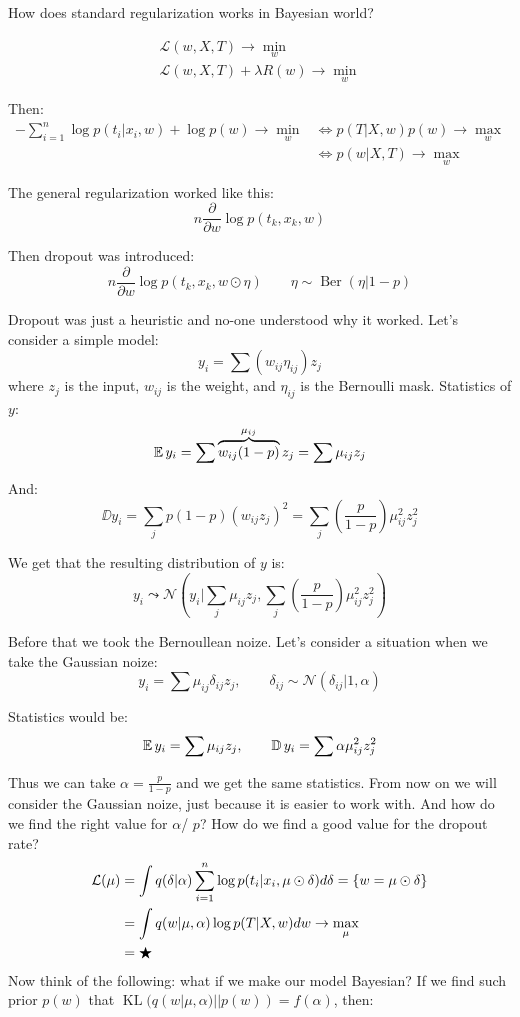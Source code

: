 How does standard regularization works in Bayesian world?

\begin{gather*}
    \mathcal{L}(w, X, T) \to \min_w \\ 
    \mathcal{L}(w, X, T) + \lambda R(w) \to \min_w
\end{gather*}

Then: 
\begin{align*}
    - \sum_{i=1}^n \log p(t_i | x_i, w) + \log p(w) \to \min_w 
    &\Longleftrightarrow p (T | X, w) p(w) \to \max_w \\
    &\Longleftrightarrow p(w | X, T) \to \max_w
\end{align*}

The general regularization worked like this: 
\[ 
    n \frac{\partial}{\partial w} \log p(t_k, x_k, w)
\] 

Then dropout was introduced: 
\[ 
    n \frac{\partial}{\partial w} \log p(t_k, x_k, w \odot \eta) \qquad \eta \sim \operatorname{Ber}(\eta | 1 - p)
\] 

Dropout was just a heuristic and no-one understood why it worked. Let's consider a simple model:
\[ 
    y_i = \sum (w_{ij} \eta_{ij}) z_j
\] 
where $z_j$ is the input, $w_{ij}$ is the weight, and $\eta_{ij}$ is the Bernoulli mask. Statistics of $y$: 
\[ 
    \operatorname{\mathbb{E}} y_i = \sum \overbrace{w_{ij} (1 - p)}^{\mu_{ij}} z_j = \sum \mu_{ij} z_j
\] 

And: 
\[ 
    \DD y_i = \sum_j p (1 - p) (w_{ij} z_j)^2 = \sum_j \left( \frac{p}{1 - p}\right) \mu_{ij}^2 z_j^2
\] 

We get that the resulting distribution of $y$ is: 
\[
    y_i \leadsto \mathcal{N} (y_i | \sum_j \mu_{ij} z_j, \sum_j \left( \frac{p}{1 - p}\right) \mu_{ij}^2 z_j^2)
\] 

Before that we took the Bernoullean noize. Let's consider a situation when we take the Gaussian noize:
\[ 
    y_i = \sum \mu_{ij} \delta_{ij} z_j, \qquad \delta_{ij} \sim \mathcal{N} (\delta_{ij} | 1, \alpha)
\]

Statistics would be: 
\[
    \operatorname{\mathbb{E}} y_i = \sum \mu_{ij} z_j, \qquad \operatorname{\mathbb{D}} y_i = \sum \alpha \mu_{ij}^2 z_j^2
\]

Thus we can take $\alpha = \frac{p}{1 - p}$ and we get the same statistics. From now on we will consider the Gaussian noize, just because it is easier to work with. And how do we find the right value for $\alpha$/ $p$? How do we find a good value for the dropout rate?
\begin{align*}
    \operatorname{\mathcal{L}} (\mu) &= \int q(\delta | \alpha) \sum_{i = 1}^n \log p(t_i | x_i, \mu \odot \delta) d \delta = \{ w = \mu \odot \delta \} \\
    &= \int q(w | \mu, \alpha) \log p(T | X, w) d w \to \max_{\mu} \\ 
    &= \bigstar  
\end{align*}
Now think of the following: what if we make our model Bayesian? If we find such prior $p(w)$ that $\operatorname{KL}(q(w | \mu, \alpha) || p(w)) = f(\alpha)$, then: 

